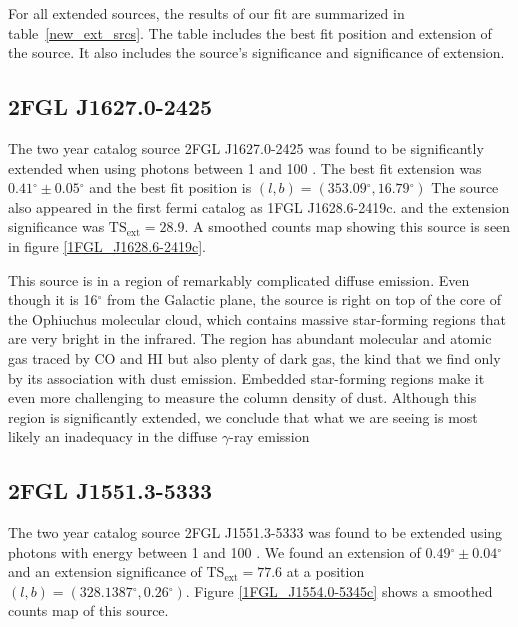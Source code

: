 \documentclass[12pt,preprint]{aastex}
\newcommand{\gev}{\text{GeV}\xspace}
\newcommand{\tsext}{{\ensuremath{\text{TS}_\text{ext}}}\xspace}
\renewcommand{\deg}{\ensuremath{^\circ}\xspace}
\begin{document}
For all extended sources, the results of our fit are summarized in
table~\ref{new_ext_srcs}. The table includes the best fit position
and extension of the source. It also includes the source's significance
and significance of extension.


\subsection{2FGL J1627.0-2425}


The two year catalog source 2FGL J1627.0-2425 was found to be significantly
extended when using photons between 1 \gev and 100 \gev.  The best
fit extension was $0.41\deg\pm0.05\deg$ and the best fit position is
$(l,b)=(353.09\deg, 16.79\deg)$ The source also appeared in the first
fermi catalog as 1FGL J1628.6-2419c.  and the extension significance
was $\tsext=28.9$.  A smoothed counts map showing this source is seen
in figure \ref{1FGL_J1628.6-2419c}.

This source is in a region of remarkably complicated diffuse emission.
Even though it is 16\deg from the Galactic plane,
the source is right on top of the core of the Ophiuchus molecular cloud,
which contains massive star-forming regions that are very bright
in the infrared.  The region has abundant molecular and atomic gas
traced by CO and HI but also plenty of dark gas, the kind that
we find only by its association with dust emission.
Embedded star-forming regions make it even more challenging to measure
the column density of dust.
Although this region is significantly extended, we conclude that what we
are seeing is most likely an inadequacy in the diffuse $\gamma$-ray emission


\subsection{2FGL J1551.3-5333}


The two year catalog source 2FGL J1551.3-5333 was found to be
extended using photons with energy between 1 \gev and 100 \gev.
We found an extension of $0.49\deg\pm 0.04\deg$ and an extension significance of
$\tsext=77.6$ at a position $(l,b)=(328.1387\deg,0.26\deg)$.  Figure
\ref{1FGL_J1554.0-5345c} shows a smoothed counts map of this source.
\end{document}
